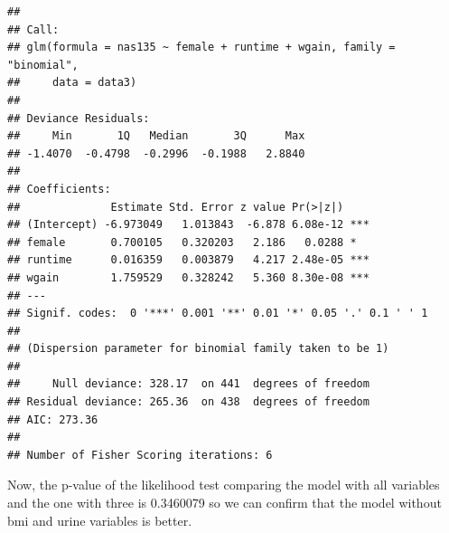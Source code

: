 \documentclass[]{article}
\begin{document}
\begin{verbatim}
## 
## Call:
## glm(formula = nas135 ~ female + runtime + wgain, family = "binomial", 
##     data = data3)
## 
## Deviance Residuals: 
##     Min       1Q   Median       3Q      Max  
## -1.4070  -0.4798  -0.2996  -0.1988   2.8840  
## 
## Coefficients:
##              Estimate Std. Error z value Pr(>|z|)    
## (Intercept) -6.973049   1.013843  -6.878 6.08e-12 ***
## female       0.700105   0.320203   2.186   0.0288 *  
## runtime      0.016359   0.003879   4.217 2.48e-05 ***
## wgain        1.759529   0.328242   5.360 8.30e-08 ***
## ---
## Signif. codes:  0 '***' 0.001 '**' 0.01 '*' 0.05 '.' 0.1 ' ' 1
## 
## (Dispersion parameter for binomial family taken to be 1)
## 
##     Null deviance: 328.17  on 441  degrees of freedom
## Residual deviance: 265.36  on 438  degrees of freedom
## AIC: 273.36
## 
## Number of Fisher Scoring iterations: 6
\end{verbatim}

Now, the p-value of the likelihood test comparing the model with all
variables and the one with three is 0.3460079 so we can confirm that the
model without bmi and urine variables is better.
\end{document}
